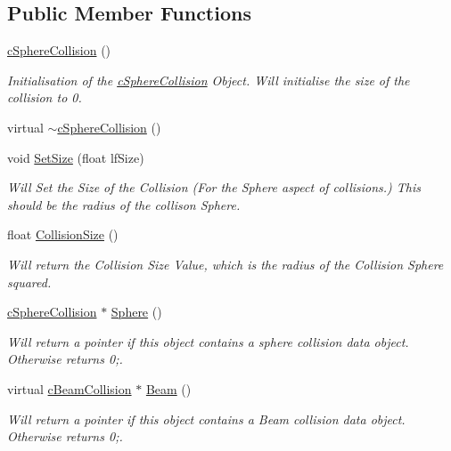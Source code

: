 \subsection*{Public Member Functions}
\begin{DoxyCompactItemize}
\item 
\hyperlink{classc_sphere_collision_a1bf8cc6c5c448614f770cd4e20490672}{cSphereCollision} ()
\begin{DoxyCompactList}\small\item\em Initialisation of the \hyperlink{classc_sphere_collision}{cSphereCollision} Object. Will initialise the size of the collision to 0. \item\end{DoxyCompactList}\item 
virtual \hyperlink{classc_sphere_collision_a628413c4fd3822a1385bcf3c4ec6fdd2}{$\sim$cSphereCollision} ()
\item 
void \hyperlink{classc_sphere_collision_ae4380fc994c031dbf950ab3dd9a95de7}{SetSize} (float lfSize)
\begin{DoxyCompactList}\small\item\em Will Set the Size of the Collision (For the Sphere aspect of collisions.) This should be the radius of the collison Sphere. \item\end{DoxyCompactList}\item 
float \hyperlink{classc_sphere_collision_aa06ac2f2047589d7d5d3b42500324dd5}{CollisionSize} ()
\begin{DoxyCompactList}\small\item\em Will return the Collision Size Value, which is the radius of the Collision Sphere squared. \item\end{DoxyCompactList}\item 
\hyperlink{classc_sphere_collision}{cSphereCollision} $\ast$ \hyperlink{classc_sphere_collision_afe7cab4c3e742baacd971b59b3893e52}{Sphere} ()
\begin{DoxyCompactList}\small\item\em Will return a pointer if this object contains a sphere collision data object. Otherwise returns 0;. \item\end{DoxyCompactList}\item 
virtual \hyperlink{classc_beam_collision}{cBeamCollision} $\ast$ \hyperlink{classc_sphere_collision_a2434ba7586a2a1167db46dccab1a430b}{Beam} ()
\begin{DoxyCompactList}\small\item\em Will return a pointer if this object contains a Beam collision data object. Otherwise returns 0;. \item\end{DoxyCompactList}\item 

\end{DoxyCompactItemize}

